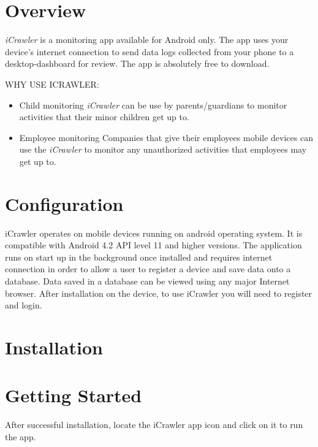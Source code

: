 \documentclass[hidelinks, 12pt, oneside]{article}
\begin{document}
	
	\tableofcontents
	\newpage
	
	\section{Overview}
	\emph{iCrawler} is a monitoring app available for Android only. The app
	 uses your device's internet connection to send data logs collected from your phone to a desktop-dashboard
	 for review. The app is absolutely free to download.\newline\newline
	 
	 \uppercase{Why use iCrawler:}\newline
	 \begin{itemize}
		\item Child monitoring\newline
		\emph{iCrawler} can be use by parents/guardians to monitor activities that their minor
		 children get up to.	
		\item Employee monitoring\newline
		Companies that give their employees mobile devices can use the \emph{iCrawler} to monitor any 
		unauthorized activities that employees may get up to.
	\end{itemize}
	\newpage
	
	
	\section{Configuration}
	iCrawler operates on mobile devices running on android operating system. It is compatible with Android 4.2 API level 11 and higher versions. The application runs on start up in the background once installed and requires internet connection in order to allow a user to register a device and save data onto a database. Data saved in a database can be viewed using any major Internet browser. After installation on the device, to use iCrawler you will need to register and login. \
	
	\section{Installation}\newpage
	
	\section{Getting Started}
	After successful installation, locate the iCrawler app icon and click on it to run the app.\
	
\end{document}

